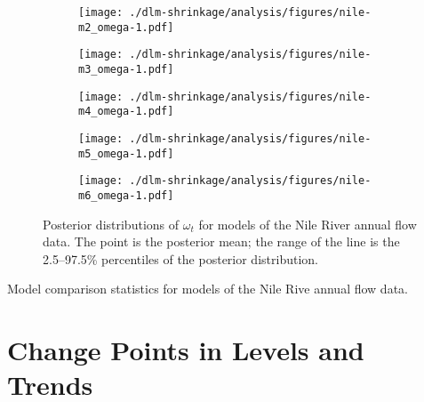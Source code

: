 \begin{figure}[htpb!]
  \centering
  \begin{subfigure}[b]{0.5\linewidth}
    \texttt{[image: ./dlm-shrinkage/analysis/figures/nile-m2\_omega-1.pdf]}    
    \caption{}
  \end{subfigure}%
  \begin{subfigure}[b]{0.5\linewidth}
    \texttt{[image: ./dlm-shrinkage/analysis/figures/nile-m3\_omega-1.pdf]}
    \caption{}
  \end{subfigure}
  \begin{subfigure}[b]{0.5\linewidth}
    \texttt{[image: ./dlm-shrinkage/analysis/figures/nile-m4\_omega-1.pdf]}    
    \caption{}
  \end{subfigure}%
  \begin{subfigure}[b]{0.5\linewidth}
    \texttt{[image: ./dlm-shrinkage/analysis/figures/nile-m5\_omega-1.pdf]}
    \caption{}
  \end{subfigure}
  \begin{subfigure}[b]{0.5\linewidth}
    \texttt{[image: ./dlm-shrinkage/analysis/figures/nile-m6\_omega-1.pdf]}    
    \caption{}
  \end{subfigure}
  \caption[Posterior distributions of $\omega_t$ for models of the Nile River annual flow data]{Posterior distributions of $\omega_t$ for models of the Nile River annual flow data. The point is the posterior mean; the range of the line is the 2.5--97.5\% percentiles of the posterior distribution.}
  \label{dlm:fig:nile_omega_posterior}
\end{figure}



\begin{table}[thbp]
  \centering
  
  \caption{Model comparison statistics for models of the Nile Rive annual flow data.}
  \label{dlm:tab:nile-model_comp}
\end{table}


\section{Change Points in Levels and Trends}
\label{dlm:sec:linear-filtering}


